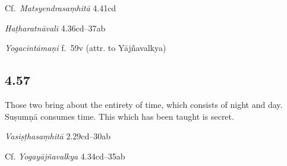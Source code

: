 \begin{ekdosis}
\begin{sources}[hp04_056]
Cf.~\emph{Matsyendrasaṃhitā} 4.41cd
\begin{versinnote}
\end{versinnote}

\end{sources}

\begin{testimonia}[hp04_056]
\emph{Haṭharatnāvalī} 4.36cd–37ab
\begin{versinnote}
\end{versinnote}

\emph{Yogacintāmaṇi} f.~59v (attr. to Yājñavalkya)
\begin{versinnote}
\end{versinnote}
\end{testimonia}


\subsection*{4.57}
\begin{translation}[hp04_057]
Those two bring about the entirety of time, which consists of night and day. Suṣumṇā consumes time. This which has been taught is secret.
\end{translation}

\begin{sources}[hp04_057]
\emph{Vasiṣṭhasaṃhitā} 2.29cd–30ab
\begin{versinnote}
\end{versinnote}

Cf. \emph{Yogayājñavalkya} 4.34cd–35ab
\begin{versinnote}
\end{versinnote}
\end{sources}


\end{ekdosis}
